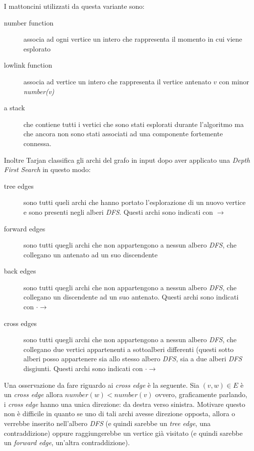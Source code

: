 I mattoncini utilizzati da questa variante sono:
\begin{description}
\item[number function] associa ad ogni vertice un intero che
  rappresenta il momento in cui viene esplorato
\item[lowlink function] associa ad vertice un intero che rappresenta
  il vertice antenato $v$ con minor \emph{number(v)}
\item[a stack] che contiene tutti i vertici che sono stati esplorati
  durante l'algoritmo ma che ancora non sono stati associati ad una
  componente fortemente connessa.
\end{description}

Inoltre Tarjan classifica gli archi del grafo in input dopo aver
applicato una \emph{Depth First Search} in questo modo: 
\begin{description}
\item[tree edges] sono tutti queli archi che hanno portato
  l'esplorazione di un nuovo vertice e sono presenti negli alberi
  \emph{DFS}. Questi archi sono indicati con $\rightarrow$
\item[forward edges] sono tutti quegli archi che non appartengono a
  nessun albero \emph{DFS}, che collegano un antenato ad un suo
  discendente
\item[back edges] sono tutti quegli archi che non appartengono a
  nessun albero \emph{DFS}, che collegano un discendente ad un suo
  antenato. Questi archi sono indicati con $\cdot\rightarrow$
\item[cross edges] sono tutti quegli archi che non appartengono a
  nessun albero \emph{DFS}, che collegano due vertici appartenenti a
  sottoalberi differenti (questi sotto alberi posso appartenere sia
  allo stesso albero \emph{DFS}, sia a due alberi \emph{DFS}
  disgiunti. Questi archi sono indicati con $\cdot\rightarrow$
\end{description}

Una osservazione da fare riguardo ai \emph{cross edge} \`e la
seguente. Sia $(v, w) \in E$ \`e un \emph{cross edge} allora
$number(w) < number(v)$ ovvero, graficamente parlando, i \emph{cross
  edge} hanno una unica direzione: da destra verso sinistra. Motivare
questo non \`e difficile in quanto se uno di tali archi avesse
direzione opposta, allora o verrebbe inserito nell'albero \emph{DFS}
(e quindi sarebbe un \emph{tree edge}, una contraddizione) oppure
raggiungerebbe un vertice gi\`a visitato (e quindi sarebbe un
\emph{forward edge}, un'altra contraddizione).


